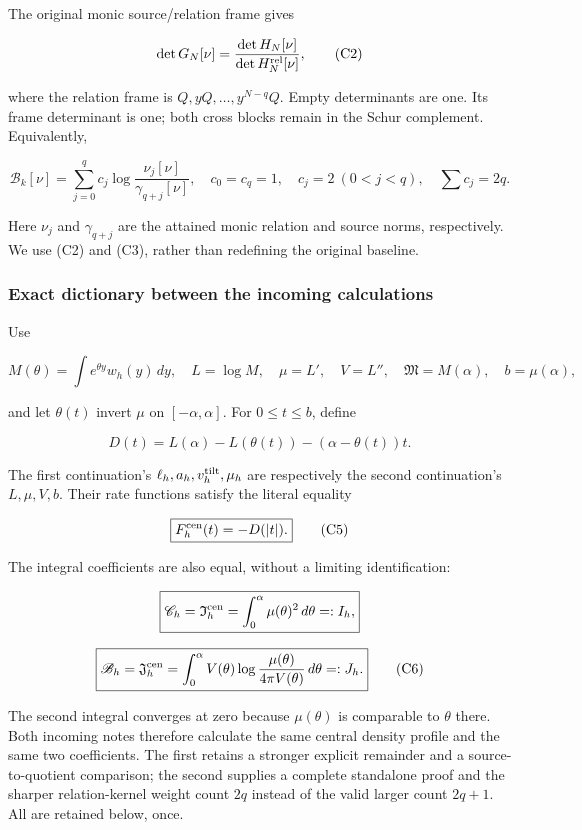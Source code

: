 \documentclass[11pt,a4paper]{article}
\begin{document}
The original monic source/relation frame gives

\[
\det G_N[\nu]=\frac{\det H_N[\nu]}{\det H_N^{\rm rel}[\nu]},
\tag{C2}
\]

where the relation frame is \(Q,yQ,\ldots,y^{N-q}Q\). Empty determinants are one. Its frame determinant is one; both cross blocks remain in the Schur complement. Equivalently,

\[
\mathcal B_k[\nu]=\sum_{j=0}^q c_j
\log\frac{\nu_j[\nu]}{\gamma_{q+j}[\nu]},\quad
c_0=c_q=1,\quad c_j=2\ (0<j<q),\quad \sum c_j=2q.
\tag{C3}
\]

Here \(\nu_j\) and \(\gamma_{q+j}\) are the attained monic relation and source norms, respectively. We use (C2) and (C3), rather than redefining the original baseline.

\subsubsection{Exact dictionary between the incoming calculations}\label{loc:exact-dictionary-between-the-incoming-calculations}

Use

\[
M(\theta)=\int e^{\theta y}w_h(y)\,dy,\quad L=\log M,
\quad \mu=L',\quad V=L'',\quad
\mathfrak M=M(\alpha),\quad b=\mu(\alpha),
\]

and let \(\theta(t)\) invert \(\mu\) on \([-\alpha,\alpha]\). For \(0\le t\le b\), define

\[
D(t)=L(\alpha)-L(\theta(t))-(\alpha-\theta(t))t.
\tag{C4}
\]

The first continuation's \(\ell_h,a_h,v_h^{\rm tilt},\mu_h\) are respectively the second continuation's \(L,\mu,V,b\). Their rate functions satisfy the literal equality

\[
\boxed{F_h^{\rm cen}(t)=-D(|t|).}
\tag{C5}
\]

The integral coefficients are also equal, without a limiting identification:

\[
\boxed{\mathscr C_h=\mathfrak I_h^{\rm cen}
=\int_0^\alpha\mu(\theta)^2\,d\theta=:I_h,}
\]

\[
\boxed{\mathscr B_h=\mathfrak J_h^{\rm cen}
=\int_0^\alpha V(\theta)
\log\frac{\mu(\theta)}{4\pi V(\theta)}\,d\theta=:J_h.}
\tag{C6}
\]

The second integral converges at zero because \(\mu(\theta)\) is comparable to \(\theta\) there. Both incoming notes therefore calculate the same central density profile and the same two coefficients. The first retains a stronger explicit remainder and a source-to-quotient comparison; the second supplies a complete standalone proof and the sharper relation-kernel weight count \(2q\) instead of the valid larger count \(2q+1\). All are retained below, once.
\end{document}

